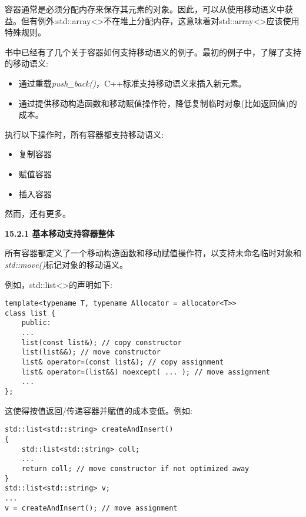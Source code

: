 容器通常是必须分配内存来保存其元素的对象。因此，可以从使用移动语义中获益。但有例外:std::array<>不在堆上分配内存，这意味着对std::array<>应该使用特殊规则。\par

书中已经有了几个关于容器如何支持移动语义的例子。最初的例子中，了解了支持的移动语义:\par

\begin{itemize}
	\item 通过重载\textit{push\_back()}，C++标准支持移动语义来插入新元素。
	\item 通过提供移动构造函数和移动赋值操作符，降低复制临时对象(比如返回值)的成本。
\end{itemize}

执行以下操作时，所有容器都支持移动语义:\par

\begin{itemize}
	\item 复制容器
	\item 赋值容器
	\item 插入容器
\end{itemize}

然而，还有更多。\par

\hspace*{\fill} \par %
\textbf{15.2.1 基本移动支持容器整体}

所有容器都定义了一个移动构造函数和移动赋值操作符，以支持未命名临时对象和\textit{std::move()}标记对象的移动语义。\par

例如，std::list<>的声明如下:\par

\begin{lstlisting}[caption={}]
template<typename T, typename Allocator = allocator<T>>
class list {
	public:
	...
	list(const list&); // copy constructor
	list(list&&); // move constructor
	list& operator=(const list&); // copy assignment
	list& operator=(list&&) noexcept( ... ); // move assignment
	...
};
\end{lstlisting}

这使得按值返回/传递容器并赋值的成本变低。例如:\par

\begin{lstlisting}[caption={}]
std::list<std::string> createAndInsert()
{
	std::list<std::string> coll;
	...
	return coll; // move constructor if not optimized away
}
std::list<std::string> v;
...
v = createAndInsert(); // move assignment
\end{lstlisting}

